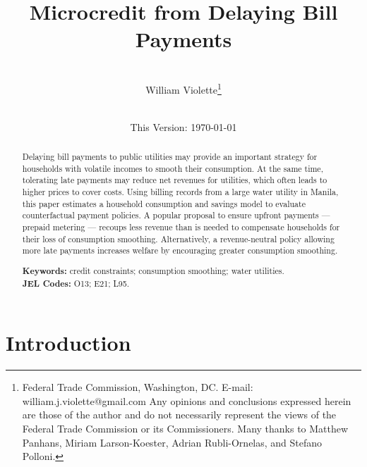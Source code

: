 \documentclass[12pt,table]{article}
\begin{document}
\begin{titlepage} 
\title{Microcredit from Delaying Bill Payments}
\author{\\[3em]
  William Violette\thanks{Federal Trade Commission, Washington, DC. E-mail: william.j.violette@gmail.com   Any opinions and conclusions expressed herein are those of the author and do not necessarily represent the views of the Federal Trade Commission or its Commissioners.  Many thanks to Matthew Panhans, Miriam Larson-Koester, Adrian Rubli-Ornelas, and Stefano Polloni.} \\
 \\ 
  }
\vspace{30mm}
\date{\vspace{5mm}This Version: \today}
\maketitle
\begin{abstract}

Delaying bill payments to public utilities may provide an important strategy for households with volatile incomes to smooth their consumption.  At the same time, tolerating late payments may reduce net revenues for utilities, which often leads to higher prices to cover costs.  Using billing records from a large water utility in Manila, this paper estimates a household consumption and savings model to evaluate counterfactual payment policies.  A popular proposal to ensure upfront payments --- prepaid metering --- recoups less revenue than is needed to compensate households for their loss of consumption smoothing.  Alternatively, a revenue-neutral policy allowing more late payments increases welfare by encouraging greater consumption smoothing.



\vspace{1in}
\textbf{Keywords:} credit constraints; consumption smoothing; water utilities. \\
\textbf{JEL Codes:} O13; E21; L95. \\
\bigskip
\end{abstract}
\setcounter{page}{0}
\thispagestyle{empty}
\end{titlepage}
\pagebreak \newpage

\onehalfspacing

\section{Introduction}
\end{document}

